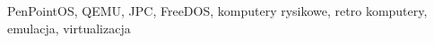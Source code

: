 \documentclass[
    bindingoffset=5mm,  %
    footnoteindent=3mm, %
    hyphenation=true    %
]{src/wut-thesis}
\begin{document}
\secondkeywords
PenPointOS, QEMU, JPC, FreeDOS, komputery rysikowe, retro komputery, emulacja,
virtualizacja

\pagestyle{plain}

\cleardoublepage %
\tableofcontents

\cleardoublepage %
\pagestyle{headings}








\cleardoublepage %
\printbibliography
\clearpage

\acronymlist
\vspace{0.8cm}

\pagestyle{plain}

\listoffigurestoc    %


\captionsetup[figure]{list=no}
\captionsetup[table]{list=no}

%

\end{document}
